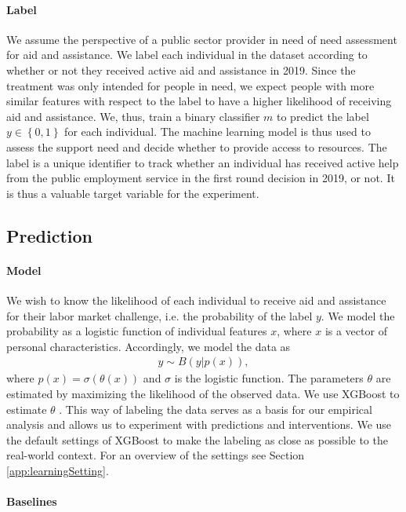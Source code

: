 \paragraph{Label}
We assume the perspective of a public sector provider in need of need assessment for aid and assistance. We label each individual in the dataset according to whether or not they received active aid and assistance in 2019. Since the treatment was only intended for people in need, we expect people with more similar features with respect to the label to have a higher likelihood of receiving aid and assistance. We, thus, train a binary classifier $m$ to predict the label $y \in \left\{ 0, 1 \right\}$ for each individual. The machine learning model is thus used to assess the support need and decide whether to provide access to resources. The label is a unique identifier to track whether an individual has received active help from the public employment service in the first round decision in 2019, or not. It is thus a valuable target variable for the experiment.

\subsection{Prediction}
\label{sec:prediction}
\paragraph{Model}
We wish to know the likelihood of each individual to receive aid and assistance for their labor market challenge, i.e. the probability of the label $y$. We model the probability as a logistic function of individual features $x$, where $x$ is a vector of personal characteristics. Accordingly, we model the data as
\begin{align*}
y\sim B(y|p(x)),
\end{align*}
where $p(x)=\sigma(\theta(x))$ and $\sigma$ is the logistic function. The parameters $\theta$ are estimated by maximizing the likelihood of the observed data. We use XGBoost to estimate $\theta$ \cite{chen2016}. This way of labeling the data serves as a basis for our empirical analysis and allows us to experiment with predictions and interventions. We use the default settings of XGBoost to make the labeling as close as possible to the real-world context. For an overview of the settings see Section \ref{app:learningSetting}.

\paragraph{Baselines}

